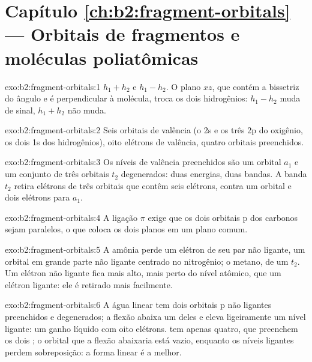 \section*{Capítulo \ref{ch:b2:fragment-orbitals} --- Orbitais de fragmentos e moléculas poliatômicas}

\begin{solution}{exo:b2:fragment-orbitals:1}
$h_1 + h_2$ e $h_1 - h_2$. O plano $xz$, que contém a bissetriz do ângulo e é
perpendicular à molécula, troca os dois hidrogênios: $h_1 - h_2$ muda de
sinal, $h_1 + h_2$ não muda.
\end{solution}

\begin{solution}{exo:b2:fragment-orbitals:2}
Seis orbitais de valência (o 2s e os três 2p do oxigênio, os dois 1s dos
hidrogênios), oito elétrons de valência, quatro orbitais preenchidos.
\end{solution}

\begin{solution}{exo:b2:fragment-orbitals:3}
Os níveis de valência preenchidos são um orbital $a_1$ e um conjunto de três
orbitais $t_2$ degenerados: duas energias, duas bandas. A banda $t_2$ retira
elétrons de três orbitais que contêm seis elétrons, contra um orbital e dois
elétrons para $a_1$.
\end{solution}

\begin{solution}{exo:b2:fragment-orbitals:4}
A ligação $\pi$ exige que os dois orbitais p dos carbonos sejam paralelos, o
que coloca os dois planos  em um plano comum.
\end{solution}

\begin{solution}{exo:b2:fragment-orbitals:5}
A amônia perde um elétron de seu par não ligante, um orbital em grande parte
não ligante centrado no nitrogênio; o metano, de um  $t_2$. Um
elétron não ligante fica mais alto, mais perto do nível atômico, que um
elétron ligante: ele é retirado mais facilmente.
\end{solution}

\begin{solution}{exo:b2:fragment-orbitals:6}
A água linear tem dois orbitais p não ligantes preenchidos e degenerados; a
flexão abaixa um deles e eleva ligeiramente um nível ligante: um ganho líquido
com oito elétrons.  tem apenas quatro, que preenchem os dois ; o orbital que a flexão abaixaria está vazio, enquanto os níveis
ligantes perdem sobreposição: a forma linear é a melhor.
\end{solution}

